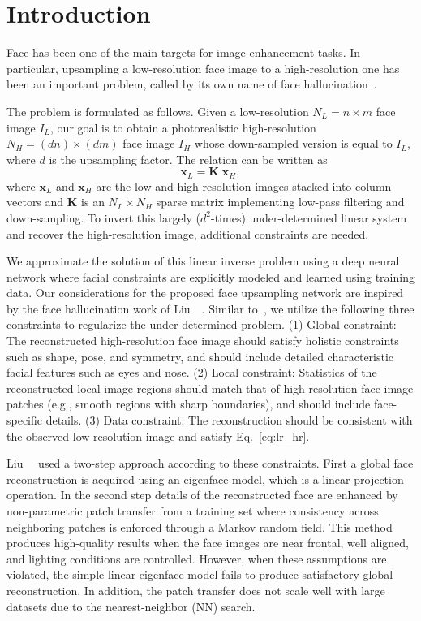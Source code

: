 \documentclass[runningheads]{llncs}
\begin{document}
\section{Introduction} \label{sec:intro}



Face has been one of the main targets for image enhancement tasks. In particular, upsampling a low-resolution face image to a high-resolution one has been an important problem, called by its own name of face hallucination~\cite{Baker00FG}.

The problem is formulated as follows. Given a low-resolution $N_L = n \times m$ face image $I_L$, our goal is to obtain a photorealistic high-resolution $N_H = (d  n) \times (d  m)$ face image $I_H$ whose down-sampled version is equal to $I_L$, where $d$ is the upsampling factor. The relation can be written as
\begin{equation}\label{eq:lr_hr}
 \mathbf{x}_L = \mathbf{K} \; \mathbf{x}_H ,
\end{equation}
where $\mathbf{x}_L$ and $\mathbf{x}_H$ are the low and high-resolution images stacked into column vectors and $\mathbf{K}$ is an $N_L \times N_H$ sparse matrix implementing low-pass filtering and down-sampling. To invert this largely ($d^2$-times) under-determined linear system and recover the high-resolution image, additional constraints are needed.

We approximate the solution of this linear inverse problem using a deep neural network where facial constraints are explicitly modeled and learned using training data.
Our considerations for the proposed face upsampling network are inspired by the face hallucination work of Liu~\etal~\cite{Liu07}. Similar to~\cite{Liu07}, we utilize the following three constraints to regularize the under-determined problem. (1) Global constraint: The reconstructed high-resolution face image should satisfy holistic constraints such as shape, pose, and symmetry, and should include detailed characteristic facial features such as eyes and nose. (2) Local constraint: Statistics of the reconstructed local image regions should match that of high-resolution face image patches (e.g., smooth regions with sharp boundaries), and should include face-specific details. (3) Data constraint: The reconstruction should be consistent with the observed low-resolution image and satisfy Eq.~\eqref{eq:lr_hr}.

Liu~\etal~\cite{Liu07} used a two-step approach according to these constraints. First a global face reconstruction is acquired using an eigenface model, which is a linear projection operation. In the second step details of the reconstructed face are enhanced by non-parametric patch transfer from a training set where consistency across neighboring patches is enforced through a Markov random field. This method produces high-quality results when the face images are near frontal, well aligned, and lighting conditions are controlled. However, when these assumptions are violated, the simple linear eigenface model fails to produce satisfactory global reconstruction. In addition, the patch transfer does not scale well with large datasets due to the nearest-neighbor (NN) search.
\end{document}
